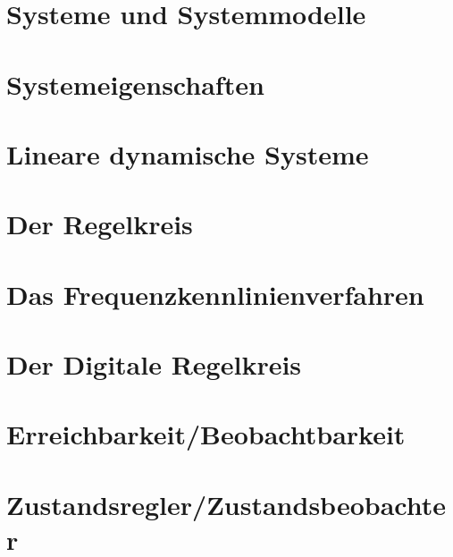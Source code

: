 	\section{Systeme und Systemmodelle}
	
	\section{Systemeigenschaften}
	
	\section{Lineare dynamische Systeme}
	
	\section{Der Regelkreis}
	
	\section{Das Frequenzkennlinienverfahren}
	
	\section{Der Digitale Regelkreis}
	
	\section{Erreichbarkeit/Beobachtbarkeit}
	
	\section{Zustandsregler/Zustandsbeobachter}
	